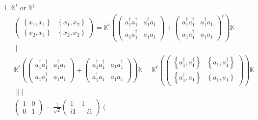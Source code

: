\documentclass[aps,preprint]{revtex4}
\begin{document}
\begin{enumerate}
\begin{enumerate}
\item $\mathbb{K}^{t}$ or $\mathbb{K}^{\dagger }$%
\begin{gather}
\left( 
\begin{array}{cc}
\left\{ x_{1},x_{1}\right\} & \left\{ x_{1},x_{2}\right\} \\ 
\left\{ x_{2},x_{1}\right\} & \left\{ x_{2},x_{2}\right\}%
\end{array}%
\right) =\mathbb{K}^{t}\left( \left( 
\begin{array}{cc}
a_{1}^{\dagger }a_{1}^{\dagger } & a_{1}^{\dagger }a_{1} \\ 
a_{1}a_{1}^{\dagger } & a_{1}a_{1}%
\end{array}%
\right) +\left( 
\begin{array}{cc}
a_{1}^{\dagger }a_{1}^{\dagger } & a_{1}^{\dagger }a_{1} \\ 
a_{1}a_{1}^{\dagger } & a_{1}a_{1}%
\end{array}%
\right) ^{t}\right) \mathbb{K} \\
\parallel \\
\mathbb{K}^{t}\left( \left( 
\begin{array}{cc}
a_{1}^{\dagger }a_{1}^{\dagger } & a_{1}^{\dagger }a_{1} \\ 
a_{1}a_{1}^{\dagger } & a_{1}a_{1}%
\end{array}%
\right) +\left( 
\begin{array}{cc}
a_{1}^{\dagger }a_{1}^{\dagger } & a_{1}a_{1}^{\dagger } \\ 
a_{1}^{\dagger }a_{1} & a_{1}a_{1}%
\end{array}%
\right) \right) \mathbb{K=K}^{t}\left( \left( 
\begin{array}{cc}
\left\{ a_{1}^{\dagger },a_{1}^{\dagger }\right\} & \left\{
a_{1},a_{1}^{\dagger }\right\} \\ 
\left\{ a_{1}^{\dagger },a_{1}\right\} & \left\{ a_{1},a_{1}\right\}%
\end{array}%
\right) \right) \mathbb{K} \\
\left. \parallel \right\vert \\
\left( 
\begin{array}{cc}
1 & 0 \\ 
0 & 1%
\end{array}%
\right) =\frac{1}{\sqrt{2}}\left( 
\begin{array}{cc}
1 & 1 \\ 
i1 & -i1%
\end{array}%
\right) \left( 
\begin{array}{cc}

\end{array}
\end{gather}
\end{enumerate}
\end{enumerate}
\end{document}

